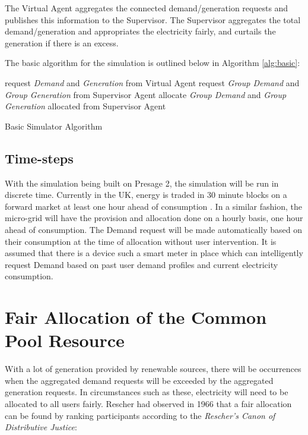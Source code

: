 The Virtual Agent aggregates the connected demand/generation requests and publishes this information to the Supervisor. The Supervisor aggregates the total demand/generation and appropriates the electricity fairly, and curtails the generation if there is an excess.

\clearpage

The basic algorithm for the simulation is outlined below in Algorithm \ref{alg:basic}: \\

\begin{algorithm}[H]
	 {
		request \textit{Demand} and \textit{Generation} from Virtual Agent\;
	}
	 {
		request \textit{Group Demand} and \textit{Group Generation} from Supervisor Agent\;
	}
	 {
		allocate \textit{Group Demand} and \textit{Group Generation} allocated from Supervisor Agent\;
	}
	\caption{Basic Simulator Algorithm}
	\label{alg:basic}
\end{algorithm}

\subsection*{Time-steps}
With the simulation being built on Presage 2, the simulation will be run in discrete time. Currently in the UK, energy is traded in 30 minute blocks on a forward market at least one hour ahead of consumption \cite{OFGEM-reform:2015}. In a similar fashion, the micro-grid will have the provision and allocation done on a hourly basis, one hour ahead of consumption. The Demand request will be made automatically based on their consumption at the time of allocation without user intervention. It is assumed that there is a device such a smart meter in place which can intelligently request Demand based on past user demand profiles and current electricity consumption. 

\section*{Fair Allocation of the Common Pool Resource}
With a lot of generation provided by renewable sources, there will be occurrences when the aggregated demand requests will be exceeded by the aggregated generation requests. In circumstances such as these, electricity will need to be allocated to all users fairly. Rescher had observed in 1966 that a fair allocation can be found by ranking participants according to the \textit{Rescher's Canon of Distributive Justice}:

